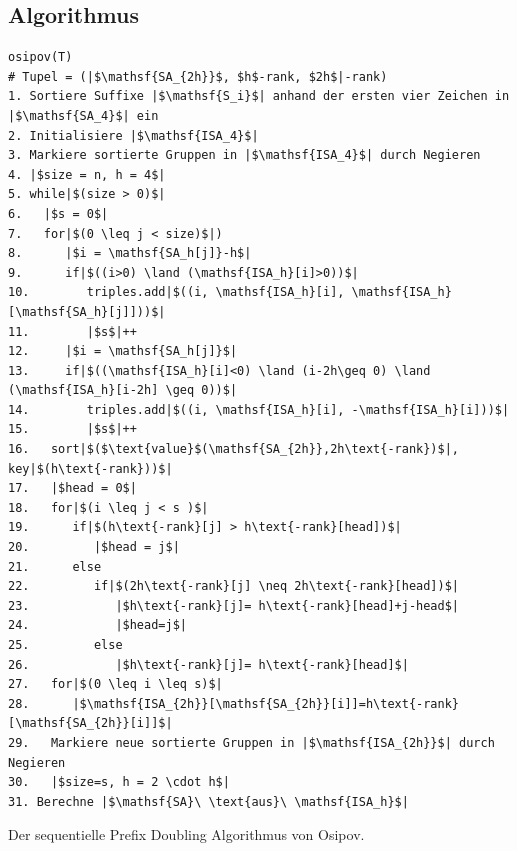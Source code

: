 \subsection{Algorithmus}
\begin{listing}
\begin{verbatim}
osipov(T)
# Tupel = (|$\mathsf{SA_{2h}}$, $h$-rank, $2h$|-rank)
1. Sortiere Suffixe |$\mathsf{S_i}$| anhand der ersten vier Zeichen in |$\mathsf{SA_4}$| ein 
2. Initialisiere |$\mathsf{ISA_4}$| 
3. Markiere sortierte Gruppen in |$\mathsf{ISA_4}$| durch Negieren
4. |$size = n, h = 4$| 
5. while|$(size > 0)$|  
6.   |$s = 0$|
7.   for|$(0 \leq j < size)$|)
8.      |$i = \mathsf{SA_h[j]}-h$|
9.      if|$((i>0) \land (\mathsf{ISA_h}[i]>0))$|
10.        triples.add|$((i, \mathsf{ISA_h}[i], \mathsf{ISA_h}[\mathsf{SA_h}[j]]))$|
11.        |$s$|++
12.     |$i = \mathsf{SA_h[j]}$|
13.     if|$((\mathsf{ISA_h}[i]<0) \land (i-2h\geq 0) \land (\mathsf{ISA_h}[i-2h] \geq 0))$|
14.        triples.add|$((i, \mathsf{ISA_h}[i], -\mathsf{ISA_h}[i]))$|
15.        |$s$|++
16.   sort|$($\text{value}$(\mathsf{SA_{2h}},2h\text{-rank})$|, key|$(h\text{-rank}))$|
17.   |$head = 0$|
18.   for|$(i \leq j < s )$|
19.      if|$(h\text{-rank}[j] > h\text{-rank}[head])$|
20.         |$head = j$|
21.      else
22.         if|$(2h\text{-rank}[j] \neq 2h\text{-rank}[head])$|
23.            |$h\text{-rank}[j]= h\text{-rank}[head]+j-head$|
24.            |$head=j$|
25.         else
26.            |$h\text{-rank}[j]= h\text{-rank}[head]$|
27.   for|$(0 \leq i \leq s)$|
28.      |$\mathsf{ISA_{2h}}[\mathsf{SA_{2h}}[i]]=h\text{-rank}[\mathsf{SA_{2h}}[i]]$|
29.   Markiere neue sortierte Gruppen in |$\mathsf{ISA_{2h}}$| durch Negieren
30.   |$size=s, h = 2 \cdot h$| 
31. Berechne |$\mathsf{SA}\ \text{aus}\ \mathsf{ISA_h}$|
\end{verbatim}
\caption{Der sequentielle Prefix Doubling Algorithmus von Osipov.}
\label{alg:osipov}
\end{listing}

